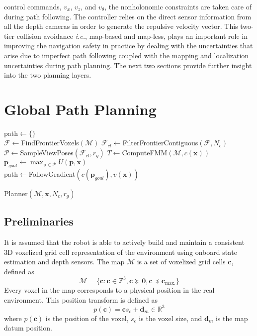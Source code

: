 \documentclass[letterpaper, 10 pt, conference]{ieeeconf}  %
\begin{document}
control commands, $v_x$, $v_z$, and $v_\theta$, the nonholonomic constraints are taken care of during path following. The controller relies on the direct sensor information from all the depth cameras in order to generate the repulsive velocity vector. This two-tier collision avoidance \textit{i.e.}, map-based and map-less, plays an important role in improving the navigation safety in practice by dealing with the uncertainties that arise due to imperfect path following coupled with the mapping and localization uncertainties during path planning. The next two sections provide further insight into the two planning layers.

\section{Global Path Planning}
\label{sec:global_planning}

\begin{algorithm}
\begin{algorithmic}[1]
  \STATE path$ \gets \{\}$ \\
  \STATE $\mathcal{F} \gets $FindFrontierVoxels$(\mathcal{M})$
  \STATE $\mathcal{F}_{cl} \gets$FilterFrontierContiguous$(\mathcal{F},N_{c})$\\
  \STATE $\mathcal{P} \gets $SampleViewPoses$(\mathcal{F}_{cl},r_{g})$
  \STATE $T \gets $ComputeFMM$(\mathcal{M},c(\textbf{x}))$ \\
  \STATE $\textbf{p}_{goal} \gets \max_{\textbf{p} \in \mathcal{P}} U(\textbf{p}, \textbf{x})$ \\
  \STATE path$ \gets $FollowGradient$(c(\textbf{p}_{goal}), v(\textbf{x}))$ \\
\end{algorithmic}
\caption{Planner$(\mathcal{M},\textbf{x}, N_{c}, r_{g})$}
\label{algorithm:FrontierPlanning}
\end{algorithm}

\subsection{Preliminaries}
It is assumed that the robot is able to actively build and maintain a consistent 3D voxelized grid cell representation of the environment using onboard state estimation and depth sensors.  The map $\mathcal{M}$ is a set of voxelized grid cells $\bm{c}$, defined as 
\begin{equation}
    \mathcal{M} = \{ \bm{c} : \bm{c} \in \mathbb{Z}^3,
    \bm{c} \succeq \bm{0},
    \bm{c} \preceq \bm{c}_{\text{max}.}
    \}
\end{equation}
Every voxel in the map corresponds to a physical position in the real environment.  This position transform is defined as
\begin{equation}
    p(\bm{c}) = \bm{c}s_c + \bm{d}_m \in \mathbb{R}^3
\end{equation}
where $p(\bm{c})$ is the position of the voxel, $s_c$ is the voxel size, and $\bm{d}_m$ is the map datum position.  
\end{document}
